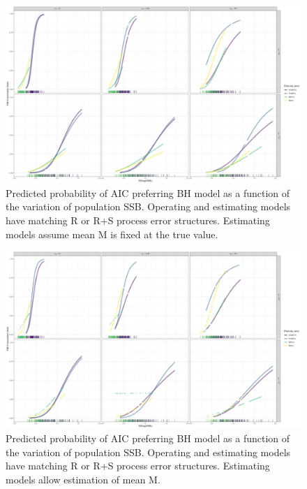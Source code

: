 \documentclass[
  12pt,
]{article}
\begin{document}
\clearpage

\begin{figure}
\caption{Predicted probability of AIC preferring BH model as a function of the variation of population SSB. Operating and estimating models have matching R or R+S process error structures. Estimating models assume mean M is fixed at the true value.}\label{naa_om_MF_BH_glm_AIC_plots}
\begin{center}
\includegraphics[width = \textwidth]{naa_om_MF_pred_BH_best.png}
\end{center}
\end{figure}

\begin{figure}
\caption{Predicted probability of AIC preferring BH model as a function of the variation of population SSB. Operating and estimating models have matching R or R+S process error structures. Estimating models allow estimation of mean M.}\label{naa_om_ME_BH_glm_AIC_plots}
\begin{center}
\includegraphics[width = \textwidth]{naa_om_ME_pred_BH_best.png}
\end{center}
\end{figure}
\end{document}
